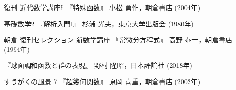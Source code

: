 \documentclass[b5paper,draft]{ltjsbook}
\begin{document}
\begin{thebibliography}{9}
     復刊 近代数学講座5 『特殊函数』 小松 勇作，朝倉書店 (2004年)

     基礎数学2 『解析入門I』 杉浦 光夫，東京大学出版会 (1980年)

     朝倉 復刊セレクション 新数学講座 『常微分方程式』 高野 恭一，朝倉書店 (1994年)

     『球面調和函数と群の表現』 野村 隆昭，日本評論社 (2018年)

     すうがくの風景 7 『超幾何関数』 原岡 喜重，朝倉書店 (2002年)




\end{thebibliography}
\end{document}
